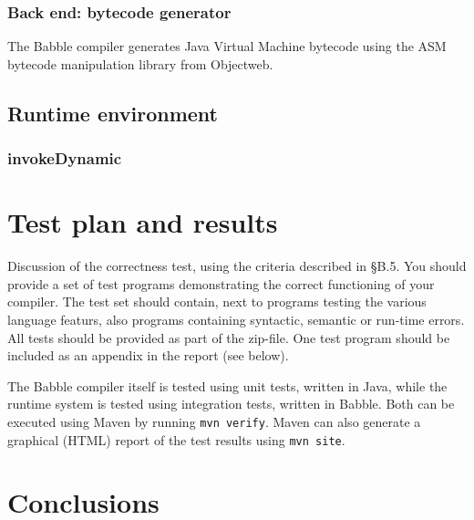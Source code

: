 \documentclass[a4paper]{article}
\begin{document}
\subsubsection{Back end: bytecode generator}

The Babble compiler generates Java Virtual Machine bytecode using the ASM bytecode manipulation library from Objectweb.

\subsection{Runtime environment}

\subsubsection{invokeDynamic}

\section{Test plan and results}
Discussion of the correctness test, using the criteria described in §B.5. You
should provide a set of test programs demonstrating the correct functioning of your compiler. The test
set should contain, next to programs testing the various language featurs, also programs containing
syntactic, semantic or run-time errors.
All tests should be provided as part of the zip-file. One test program should be included as an appendix
in the report (see below).


The Babble compiler itself is tested using unit tests, written in Java, while the runtime system is tested using integration tests, written in Babble.
Both can be executed using Maven by running \texttt{mvn verify}.
Maven can also generate a graphical (HTML) report of the test results using \texttt{mvn site}.


\section{Conclusions}

\clearpage
\end{document}
